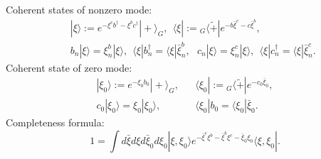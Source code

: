 \documentclass[12pt,a4paper]{article}
\begin{document}
Coherent states of nonzero mode:
\begin{eqnarray}
&&|\xi\rangle:=e^{-\xi^c b^\dagger-\xi^b c^\dagger}|+\rangle_G,\ \  \langle\xi|:= {}_G\langle{\tilde +}|e^{-b{\bar \xi}^c-c{\bar \xi}^b},\nonumber \\
&&b_n|\xi\rangle=\xi^b_n|\xi\rangle,\ \ \langle\xi|b^\dagger_n=\langle\xi|{\bar \xi}^b_n,\ \ \ c_n|\xi\rangle=\xi^c_n|\xi\rangle,\ \ \langle\xi|c^\dagger_n=\langle\xi|{\bar \xi}^c_n.
\end{eqnarray}
Coherent state of zero mode:
\begin{eqnarray}
|\xi_0\rangle:=e^{-\xi_0b_0}|+\rangle_G,&& \langle\xi_0|:= {}_G\langle{\tilde +}|e^{-c_0{\bar \xi}_0},\nonumber \\
c_0|\xi_0\rangle=\xi_0|\xi_0\rangle, && \langle\xi_0|b_0=\langle\xi_0|{\bar \xi}_0.
\end{eqnarray}
Completeness formula:
\begin{equation}
1=\int d{\bar \xi}d\xi d{\bar \xi}_0d\xi_0|\xi,\xi_0\rangle e^{-{\bar \xi}^c\xi^b-{\bar \xi}^b\xi^c-{\bar \xi}_0\xi_0}\langle\xi,\xi_0|.
\end{equation}
\end{document}

